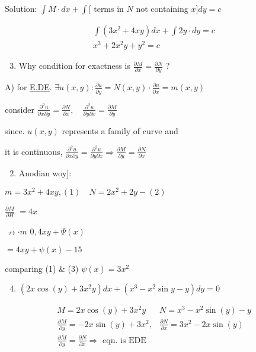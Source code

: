 \documentclass[12pt, a4paper]{article}
\begin{document}
Solution: $\int M \cdot d x+\int[$ terms in $N$ not containing $x] d y=c$

$$
	\begin{gathered}
		\int\left(3 x^2 +4 x y\right) d x+\int 2 y \cdot d y=c \\
		x^{3}+2 x^2 y+y^2=c
	\end{gathered}
$$

\begin{enumerate}
	\setcounter{enumi}{2}
	\item Why condition for exactness is $\frac{\partial M}{\partial x}=\frac{\partial N}{\partial y}$ ?
\end{enumerate}

A) for \href{http://E.DE}{E.DE}. $\exists u(x, y): \frac{\partial u}{\partial y}=N(x, y) \cdot \frac{\partial u}{\partial x}=m(x, y)$

consider $\frac{\partial^{2} u}{\partial x \partial y}=\frac{\partial N}{\partial x}, \quad \frac{\partial^{2} u}{\partial y \partial x}=\frac{\partial M}{\partial y}$

since. $u(x, y)$ represents a family of curve and

it is continuous, $\frac{\partial^{2} u}{\partial x \partial y}=\frac{\partial^{2} u}{\partial y \partial x} \Rightarrow \frac{\partial M}{\partial y}=\frac{\partial N}{\partial x}$

\begin{enumerate}
	\setcounter{enumi}{1}
	\item Anodian woy]:
\end{enumerate}

$m=3 x^2 +4 x y,(1) \quad N=2 x^2 +2 y-(2)$

$\frac{\partial M}{\partial H}$ $=4 x$

$\nrightarrow \cdot m$ $0,4 x y+\Psi(x)$

$=4 x y+\psi(x)-15$

comparing (1) \& (3) $\psi(x)=3 x^2 $

\begin{enumerate}
	\setcounter{enumi}{3}
	\item $\left(2 x \cos(y)+3 x^2 y\right) d x+\left(x^{3}-x^2 \sin y-y\right) d y=0$
\end{enumerate}

$$
	\begin{array}{ll}
		M=2 x \cos(y)+3 x^2 y                              & N=x^{3}-x^2 \sin(y)-y                            \\
		\frac{\partial M}{\partial y}=-2 x \sin(y)+3 x^2 , & \frac{\partial N}{\partial x}=3 x^2 -2 x \sin(y) \\
		\frac{\partial M}{\partial y}=\frac{\partial N}{\partial x} \Rightarrow \text{ eqn. is EDE }
	\end{array}
$$
\end{document}
